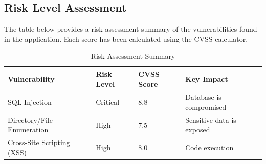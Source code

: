 \documentclass[12pt]{article}
\begin{document}
\subsection*{Risk Level Assessment}
The table below provides a risk assessment summary of the vulnerabilities found in the application. Each score has been calculated using the CVSS calculator\cite{cvss-calculator}.
\begin{table}[h]
\centering
\label{tab:risks}
\begin{tabularx}{\textwidth}{l l l X}
\toprule
\textbf{Vulnerability} & \textbf{Risk Level} & \textbf{CVSS Score} & \textbf{Key Impact} \\
\midrule
SQL Injection & \textcolor{critical}{Critical} & 8.8 & Database is compromised \\
Directory/File Enumeration & \textcolor{high}{High} & 7.5 & Sensitive data is exposed \\
Cross-Site Scripting (XSS) & \textcolor{high}{High} & 8.0 &  Code execution \\
\bottomrule
\end{tabularx}
\caption{Risk Assessment Summary}
\end{table}
\FloatBarrier
\end{document}
